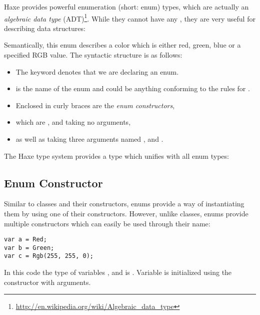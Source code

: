 Haxe provides powerful enumeration (short: enum) types, which are actually an \emph{algebraic data type} (ADT)\footnote{\url{http://en.wikipedia.org/wiki/Algebraic_data_type}}. While they cannot have any , they are very useful for describing data structures:

Semantically, this enum describes a color which is either red, green, blue or a specified RGB value. The syntactic structure is as follows:
\begin{itemize}
	\item The keyword  denotes that we are declaring an enum.
	\item {} is the name of the enum and could be anything conforming to the rules for .
	\item Enclosed in curly braces \expr{$\left\{\right\}$} are the \emph{enum constructors},
	\item which are ,  and  taking no arguments,
	\item as well as  taking three  arguments named ,  and .
\end{itemize}
The Haxe type system provides a type which unifies with all enum types:


\subsection{Enum Constructor}
\label{types-enum-constructor}

Similar to classes and their constructors, enums provide a way of instantiating them by using one of their constructors. However, unlike classes, enums provide multiple constructors which can easily be used through their name:

\begin{lstlisting}
var a = Red;
var b = Green;
var c = Rgb(255, 255, 0);
\end{lstlisting}
In this code the type of variables ,  and  is . Variable  is initialized using the  constructor with arguments.

